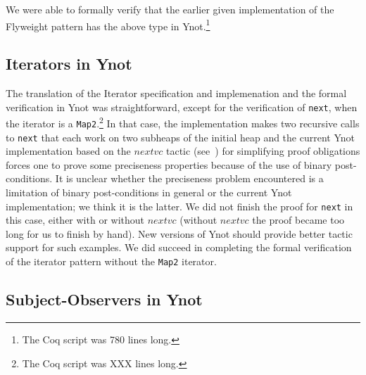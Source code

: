 We were able to formally verify that the earlier given implementation of
the Flyweight pattern has the above type in Ynot.\footnote{The Coq script was 
780 lines long.}

\subsection{Iterators in Ynot}
\label{sec:iterators-in-ynot}

The translation of the Iterator specification and implemenation and the
formal verification in Ynot was straightforward, except for the
verification of {\tt next}, when the iterator is a {\tt Map2}.\footnote{The
  Coq script was XXX lines long.}  In that case, the implementation makes
two recursive calls to {\tt next} that each work on two subheaps of the
initial heap and the current Ynot implementation based on the $nextvc$
tactic (see~\cite{nanevski08}) for simplifying proof obligations forces one
to prove some preciseness properties because of the use of binary
post-conditions. It is unclear whether the preciseness problem encountered
is a limitation of binary post-conditions in general or the current Ynot
implementation; we think it is the latter. We did not finish the proof for
{\tt next} in this case, either with or without $nextvc$ (without $nextvc$
the proof became too long for us to finish by hand).  New versions of Ynot
should provide better tactic support for such examples. 
We did succeed in completing the formal verification of the
iterator pattern  without the {\tt Map2} iterator.

\subsection{Subject-Observers in Ynot}
\label{sec:subject-observer-in-ynot}

